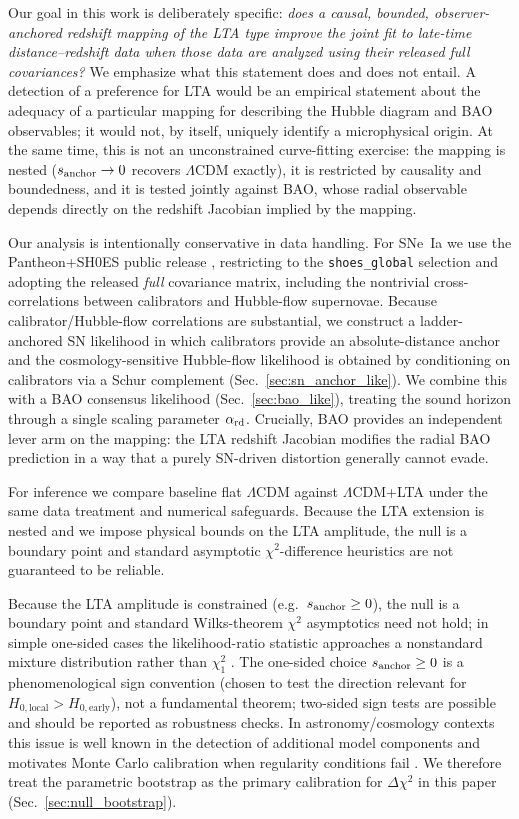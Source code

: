 \documentclass[10pt]{article}
\begin{document}
Our goal in this work is deliberately specific: \emph{does a causal, bounded, observer-anchored
redshift mapping of the LTA type improve the joint fit to late-time distance--redshift data when
those data are analyzed using their released full covariances?}
We emphasize what this statement does and does not entail.
A detection of a preference for LTA would be an empirical statement about the adequacy of a
particular mapping for describing the Hubble diagram and BAO observables; it would not, by itself,
uniquely identify a microphysical origin.
At the same time, this is not an unconstrained curve-fitting exercise: the mapping is nested
($s_{\rm anchor}\to 0$ recovers $\Lambda$CDM exactly), it is restricted by causality and
boundedness, and it is tested jointly against BAO, whose radial observable depends directly on the
redshift Jacobian implied by the mapping.

Our analysis is intentionally conservative in data handling.
For SNe~Ia we use the Pantheon+SH0ES public release \cite{Brout2022PantheonPlus,Riess2022SH0ES}, restricting to the
\texttt{shoes\_global} selection and adopting the released \emph{full} covariance matrix, including
the nontrivial cross-correlations between calibrators and Hubble-flow supernovae.
Because calibrator/Hubble-flow correlations are substantial, we construct a ladder-anchored SN
likelihood in which calibrators provide an absolute-distance anchor and the cosmology-sensitive
Hubble-flow likelihood is obtained by conditioning on calibrators via a Schur complement
(Sec.~\ref{sec:sn_anchor_like}).
We combine this with a BAO consensus likelihood (Sec.~\ref{sec:bao_like})\cite{DESI2024BAO}, treating the sound
horizon through a single scaling parameter $\alpha_{\rm rd}$.
Crucially, BAO provides an independent lever arm on the mapping: the LTA redshift Jacobian modifies
the radial BAO prediction in a way that a purely SN-driven distortion generally cannot evade.

For inference we compare baseline flat $\Lambda$CDM against $\Lambda$CDM+LTA under the same data
treatment and numerical safeguards.
Because the LTA extension is nested and we impose physical bounds on the LTA amplitude, the null is
a boundary point and standard asymptotic $\chi^2$-difference heuristics are not guaranteed to be
reliable.

Because the LTA amplitude is constrained (e.g.\ \(s_{\rm anchor}\ge 0\)), the null is a boundary
point and standard Wilks-theorem \(\chi^2\) asymptotics need not hold; in simple one-sided cases the
likelihood-ratio statistic approaches a nonstandard mixture distribution rather than \(\chi^2_1\)
\cite{Chernoff1954,SelfLiang1987}.
The one-sided choice \(s_{\rm anchor}\ge 0\) is a phenomenological sign convention (chosen to test
the direction relevant for \(H_{0,\mathrm{local}}>H_{0,\mathrm{early}}\)), not a fundamental theorem;
two-sided sign tests are possible and should be reported as robustness checks.
In astronomy/cosmology contexts this issue is well known in the detection of additional model
components and motivates Monte Carlo calibration when regularity conditions fail \cite{Protassov2002}.
We therefore treat the parametric bootstrap as the primary calibration for \(\Delta\chi^2\) in this
paper (Sec.~\ref{sec:null_bootstrap}).
\end{document}
